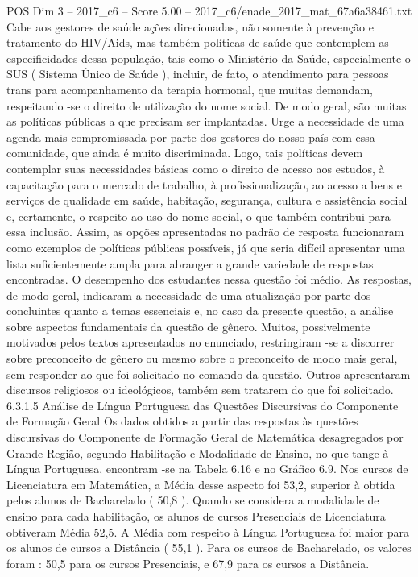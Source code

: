 \begin{textsample}{POS Dim 3 – 2017\_c6 – Score 5.00 – 2017\_c6/enade\_2017\_mat\_67a6a38461.txt}
Cabe aos gestores de saúde ações direcionadas, não somente à prevenção e tratamento do HIV/Aids, mas também políticas de saúde que contemplem as especificidades dessa população, tais como o Ministério da Saúde, especialmente o SUS ( Sistema Único de Saúde ), incluir, de fato, o atendimento para pessoas trans para acompanhamento da terapia hormonal, que muitas demandam, respeitando -se o direito de utilização do nome social.
De modo geral, são muitas as políticas públicas a que precisam ser implantadas.
Urge a necessidade de uma agenda mais compromissada por parte dos gestores do nosso país com essa comunidade, que ainda é muito discriminada.
Logo, tais políticas devem contemplar suas necessidades básicas como o direito de acesso aos estudos, à capacitação para o mercado de trabalho, à profissionalização, ao acesso a bens e serviços de qualidade em saúde, habitação, segurança, cultura e assistência social e, certamente, o respeito ao uso do nome social, o que também contribui para essa inclusão.
Assim, as opções apresentadas no padrão de resposta funcionaram como exemplos de políticas públicas possíveis, já que seria difícil apresentar uma lista suficientemente ampla para abranger a grande variedade de respostas encontradas.
O desempenho dos estudantes nessa questão foi médio.
As respostas, de modo geral, indicaram a necessidade de uma atualização por parte dos concluintes quanto a temas essenciais e, no caso da presente questão, a análise sobre aspectos fundamentais da questão de gênero.
Muitos, possivelmente motivados pelos textos apresentados no enunciado, restringiram -se a discorrer sobre preconceito de gênero ou mesmo sobre o preconceito de modo mais geral, sem responder ao que foi solicitado no comando da questão.
Outros apresentaram discursos religiosos ou ideológicos, também sem tratarem do que foi solicitado. 6.3.1.5 Análise de Língua Portuguesa das Questões Discursivas do Componente de Formação Geral Os dados obtidos a partir das respostas às questões discursivas do Componente de Formação Geral de Matemática desagregados por Grande Região, segundo Habilitação e Modalidade de Ensino, no que tange à Língua Portuguesa, encontram -se na Tabela 6.16 e no Gráfico 6.9.
Nos cursos de Licenciatura em Matemática, a Média desse aspecto foi 53,2, superior à obtida pelos alunos de Bacharelado ( 50,8 ).
Quando se considera a modalidade de ensino para cada habilitação, os alunos de cursos Presenciais de Licenciatura obtiveram Média 52,5.
A Média com respeito à Língua Portuguesa foi maior para os alunos de cursos a Distância ( 55,1 ).
Para os cursos de Bacharelado, os valores foram : 50,5 para os cursos Presenciais, e 67,9 para os cursos a Distância.

\end{textsample}
